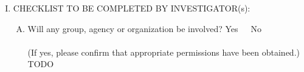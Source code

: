 \documentclass{article}
\newcommand{\response}[1]{{\color{blue}#1}}
\newcommand{\yn}{{Yes~~~No\\ }}
\begin{document}
\begin{enumerate}[I.]
\begin{enumerate}[A.]
\begin{enumerate}[1.]
            \item Are facilities/equipment adequate to handle possible adverse
                effects? \yn
            (If no, explain) \response{TODO}\\

            \item Describe arrangements for financial responsibility for any possible adverse effects.\\
            MSU Compensation(explain): \\
            Sponsoring agency insurance: \\
            Subject is responsible: \\
            Other (explain): response{TODO}\\

        \end{enumerate}
        \item CONFIDENTIALITY OF RESEARCH DATA\\

        \begin{enumerate}[1.]
            \item Will data be coded? \yn \\

            \item Will master code be kept separate from data? \yn \\

            \item Will any other agency have access to identifiable data? \yn \\

            \item How will documents, data be stored and protected?
                \response{TODO} \\
            Locked file:\\
            Computer with restricted password:\\
            Other(explain):\\

        \end{enumerate}
    \end{enumerate}
    \item CHECKLIST TO BE COMPLETED BY INVESTIGATOR(s):

    \begin{enumerate}[A.]
        \item Will any group, agency or organization be involved? \yn \\
        (If yes, please confirm that appropriate permissions have been obtained.)
            \response{TODO}


\end{enumerate}
\end{enumerate}
\end{document}
